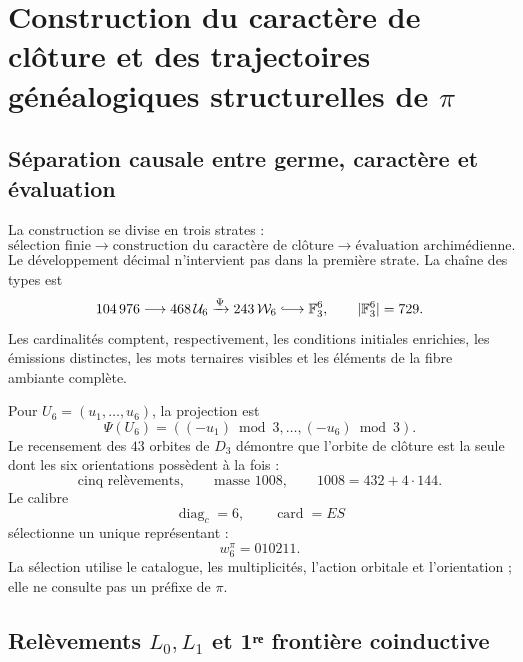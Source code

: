 \label{chap:83-08}


\section{Construction du caractère de clôture et des trajectoires généalogiques structurelles de \(\pi\)}
\label{p12-83-c8-s1:chap:biografia-pi-autonoma}

\subsection{Séparation causale entre germe, caractère et évaluation}

La construction se divise en trois strates :
\[
 \text{sélection finie}
 \longrightarrow
 \text{construction du caractère de clôture}
 \longrightarrow
 \text{évaluation archimédienne}.
\]
Le développement décimal n’intervient pas dans la première strate. La chaîne des types
est
\begin{equation}
 104\,976
 \longrightarrow468\,\mathcal U_6
 \xrightarrow{\Psi}243\,\mathcal W_6
 \lhook\joinrel\longrightarrow\mathbb F_3^6,
 \qquad|\mathbb F_3^6|=729.
 \label{p12-83-c8-s1:eq:cadena-tipica-pi-autonoma}
\end{equation}
Les cardinalités comptent, respectivement, les conditions initiales
enrichies, les émissions distinctes, les mots ternaires visibles et les éléments
de la fibre ambiante complète.

Pour \(U_6=(u_1,\ldots,u_6)\), la projection est
\[
 \Psi(U_6)=((-u_1)\bmod3,\ldots,(-u_6)\bmod3).
\]
Le recensement des \(43\) orbites de \(D_3\) démontre que l’orbite de
clôture est la seule dont les six orientations possèdent à la fois :
\[
 \text{cinq relèvements},\qquad
 \text{masse }1008,\qquad
 1008=432+4\cdot144.
\]
Le calibre
\[
 \operatorname{diag}_c=6,
 \qquad
 \operatorname{card}=ES
\]
sélectionne un unique représentant :
\begin{equation}
 \boxed{w_6^\pi=010211.}
 \label{p12-83-c8-s1:eq:semilla-pi-autonoma}
\end{equation}
La sélection utilise le catalogue, les multiplicités, l’action orbitale et l’orientation ;
elle ne consulte pas un préfixe de \(\pi\).

\subsection{Relèvements \(L_0,L_1\) et 1ʳᵉ frontière coinductive}

